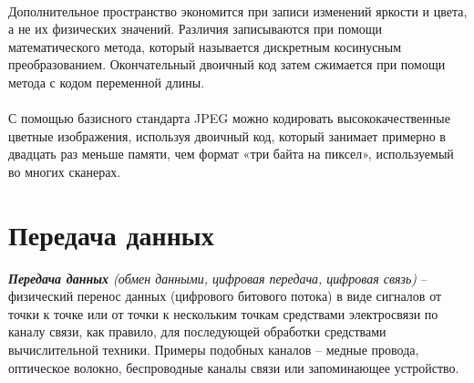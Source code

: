 \\Дополнительное пространство экономится при записи изменений яркости и цвета, а не их физических значений. Различия записываются при помощи математического метода, который называется дискретным косинусным преобразованием. Окончательный двоичный код затем сжимается при помощи метода  с кодом переменной длины.\\
\\С помощью базисного стандарта  JPEG можно кодировать высококачественные цветные изображения, используя двоичный код, который занимает примерно в двадцать раз меньше памяти, чем формат «три байта на пиксел», используемый во многих сканерах.
\section{Передача данных}
\emph{\textbf{Передача данных} (обмен данными, цифровая передача, цифровая связь)} -- физический перенос данных (цифрового битового потока) в виде сигналов от точки к точке или от точки к нескольким точкам средствами электросвязи по каналу связи, как правило, для последующей обработки средствами вычислительной техники. Примеры подобных каналов -- медные провода, оптическое волокно, беспроводные каналы связи или запоминающее устройство.\\
